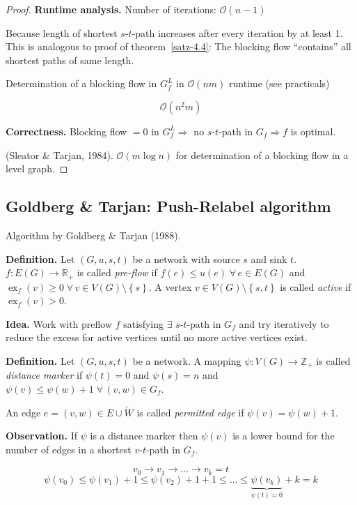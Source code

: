 \documentclass{article}
\newcommand{\set}[1]{\left\{#1\right\}}
\newcommand{\gath}[2]{$#1$-$#2$-path} %
\newcommand{\fall}{\;\forall\,}
\begin{document}
\begin{proof}
  \textbf{Runtime analysis.}
  Number of iterations: $\mathcal{O}(n-1)$

  Because length of shortest \gath st increases after every iteration by at least 1.
  This is analogous to proof of theorem~\ref{satz-4.4}: The blocking flow ``contains'' all
  shortest paths of same length.

  Determination of a blocking flow in $G^L_f$ in $\mathcal{O}(nm)$ runtime (see practicals)

  \[
    \mathcal{O}(n^2 m)
  \]

  \textbf{Correctness.}
  Blocking flow $=0$ in $G^L_f \Rightarrow$ no \gath st in $G_f \Rightarrow f$ is optimal.

  (Sleator \& Tarjan, 1984).
    $\mathcal{O}(m \log{n})$ for determination of a blocking flow in a level graph.
\end{proof}

\subsection{Goldberg \& Tarjan: Push-Relabel algorithm}
%
Algorithm by Goldberg \& Tarjan (1988).

\textbf{Definition.}
  Let $(G, u, s, t)$ be a network with source $s$ and sink $t$.
  $f: E(G) \rightarrow \mathbb{R}_+$ is called \emph{pre-flow} if $f(e) \leq u(e) \fall e \in E(G)$
  and $\operatorname{ex}_f(v) \geq 0 \fall v \in V(G) \setminus \set{s}$.
  A vertex $v \in V(G) \setminus \set{s, t}$ is called \emph{active} if $\operatorname{ex}_f(v) > 0$.

\textbf{Idea.}
  Work with preflow $f$ satisfying $\exists$ \gath st in $G_f$ and try iteratively to reduce the excess for active vertices until no more active vertices exist.

\textbf{Definition.}
  Let $(G, u, s, t)$ be a network. A mapping $\psi: V(G) \rightarrow \mathbb{Z}_+$ is called \emph{distance marker} if $\psi(t) = 0$ and $\psi(s) = n$ and $\psi(v) \leq \psi(w) + 1 \fall (v, w) \in G_f$.

An edge $e = (v, w) \in E \cup \overleftarrow{W}$ is called \emph{permitted edge} if $\psi(v) = \psi(w) + 1$.

\textbf{Observation.}
  If $\psi$ is a distance marker then $\psi(v)$ is a lower bound for the number of edges in a shortest \gath vt in $G_f$.

  \[ v_0 \rightarrow v_1 \rightarrow \dots \rightarrow v_k=t \]
  \[
    \psi(v_0) \leq \psi(v_1) + 1
      \leq \psi(v_2) + 1 + 1
      \leq \ldots
      \leq \underbrace{\psi(v_k)}_{\psi(t) = 0} + k = k
  \]
\end{document}

